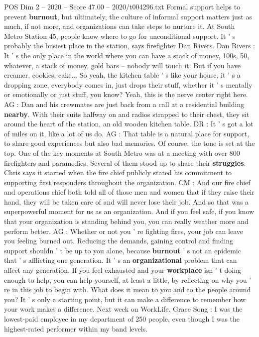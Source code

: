\begin{textsample}{POS Dim 2 – 2020 – Score 47.00 – 2020/t004296.txt}
Formal support helps to prevent \textbf{burnout}, but ultimately, the culture of informal support matters just as much, if not more, and organizations can take steps to nurture it.
At South Metro Station 45, people know where to go for unconditional support.
It ' s probably the busiest place in the station, says firefighter Dan Rivers.
Dan Rivers : It ' s the only place in the world where you can have a stack of money, 100s, 50, whatever, a stack of money, gold bars -- nobody will touch it.
But if you have creamer, cookies, cake...
So yeah, the kitchen table ' s like your house, it ' s a dropping zone, everybody comes in, just drops their stuff, whether it ' s mentally or emotionally or just stuff, you know?
Yeah, this is the nerve center right here.
AG : Dan and his crewmates are just back from a call at a residential building \textbf{nearby}.
With their suits halfway on and radios strapped to their chest, they sit around the heart of the station, an old wooden kitchen table.
DR : It ' s got a lot of miles on it, like a lot of us do.
AG : That table is a natural place for support, to share good experiences but also bad memories.
Of course, the tone is set at the top.
One of the key moments at South Metro was at a meeting with over 800 firefighters and paramedics.
Several of them stood up to share their \textbf{struggles}.
Chris says it started when the fire chief publicly stated his commitment to supporting first responders throughout the organization.
CM : And our fire chief and operations chief both told all of those men and women that if they raise their hand, they will be taken care of and will never lose their job.
And so that was a superpowerful moment for us as an organization.
And if you feel safe, if you know that your organization is standing behind you, you can really weather more and perform better.
AG : Whether or not you ' re fighting fires, your job can leave you feeling burned out.
Reducing the demands, gaining control and finding support shouldn ' t be up to you alone, because \textbf{burnout} ' s not an epidemic that ' s afflicting one generation.
It ' s an \textbf{organizational} problem that can affect any generation.
If you feel exhausted and your \textbf{workplace} isn ' t doing enough to help, you can help yourself, at least a little, by reflecting on why you ' re in this job to begin with.
What does it mean to you and to the people around you?
It ' s only a starting point, but it can make a difference to remember how your work makes a difference.
Next week on WorkLife.
Grace Song : I was the lowest-paid employee in my department of 250 people, even though I was the highest-rated performer within my band levels.

\end{textsample}
